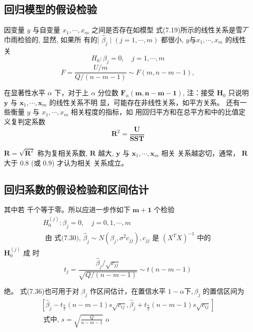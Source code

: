 \subsection{回归模型的假设检验}

因变量 \( y \) 与自变量 \( x_{1}, \cdots, x_{m} \) 之间是否存在如模型 式(7.19)所示的线性关系是雪丆巾雨检验的, 显然, 如果所 有的| \( \hat{\beta}_{j} \mid(j=1, \cdots, m) \) 都很小, \( y 与 x_{1}, \cdots, x_{m} \) 的线性关
$$
H_{0}: \beta_{j}=0, \quad j=1, \cdots, m
$$
$$
F=\frac{U / m}{Q /(n-m-1)} \sim F(m, n-m-1),
$$

在显著性水平 \( \alpha \) 下，对于上 \( \alpha \) 分位数 \( \boldsymbol{F}_{\alpha}(\boldsymbol{m}, \boldsymbol{n}-\boldsymbol{m}-\mathbf{1}) \),
注：接受 \( \boldsymbol{H}_{0} \) 只说明 \( \boldsymbol{y} \) 与 \( \boldsymbol{x}_{1}, \cdots, \boldsymbol{x}_{m} \) 的线性关系不明
显，可能存在非线性关系，如平方关系。 还有一些衡量 \( y \) 与 \( x_{1}, \cdots, x_{m} \) 相关程度的指标，如 用回归平方和在总平方和中的比值定义复判定系数
$$
\boldsymbol{R}^{2}=\frac{\boldsymbol{U}}{\boldsymbol{S S T}}
$$

\( \boldsymbol{R}=\sqrt{\boldsymbol{R}^{2}} \) 称为复相关系数, \( \boldsymbol{R} \) 越大, \( \boldsymbol{y} \) 与 \( \boldsymbol{x}_{1}, \cdots, \boldsymbol{x}_{m} \) 相关
关系越宓切，通常， \( \boldsymbol{R} \) 大于 \( 0.8 \) (或 0.9) 才认为相关
关系成立。

\subsection{回归系数的假设检验和区间估计}

其中若 千个等于零。所以应进一步作如下 \( \boldsymbol{m}+\mathbf{1} \) 个检验
$$
\begin{array}{l}
H_{0}^{(j)}: \beta_{j}=0, \quad j=0,1, \cdots, m \\
\text { 由 式(7.30), } \hat{\beta}_{j} \sim N\left(\beta_{j}, \sigma^{2} c_{j j}\right), c_{j j} \text { 是 }\left(X^{T} X\right)^{-1} \text { 中的 }
\end{array}
$$
\( \boldsymbol{H}_{0}^{(j)} \) 成 时
$$
t_{j}=\frac{\hat{\beta}_{j} / \sqrt{c_{j j}}}{\sqrt{Q /(n-m-1)}} \sim t(n-m-1)
$$

绝。 式(7.36)也可用于对 \( \beta_{j} \) 作区间估计，在置信水平 \( 1-\alpha 下, \beta_{j} \) 的置信区间为
$$
\begin{array}{l}
{\left[\hat{\beta}_{j}-t_{\frac{\alpha}{2}}(n-m-1) s \sqrt{c_{i j}}, \hat{\beta}_{j}+t_{\frac{\alpha}{2}}(n-m-1) s \sqrt{c_{i j}}\right]} \\
\text { 式中, } s=\sqrt{\frac{Q}{n-m-1}} \text { o }
\end{array}
$$

